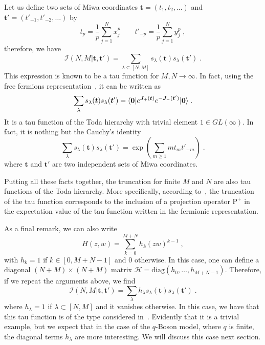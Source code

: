 \documentclass[a4paper,11pt]{amsart}
\begin{document}
Let us define two sets of Miwa coordinates \(\bm{t} = (t_1, t_2, \dots)\)
and \(\bm{t}' = (t'_{-1}, t'_{-2}, \dots)\) by
\begin{equation}
  t_p = \frac{1}{p}\sum_{j=1}^N x_j^p\qquad 
  t'_{-p} = \frac{1}{p}\sum_{j=1}^N y_j^p\; ,
\end{equation}
therefore, we have 
\begin{equation}
  \mathcal{I}(N, M|\bm{t}, \bm{t}') = \sum_{\lambda\subseteq [N,M]} s_\lambda(\bm{t}) s_\lambda(\bm{t}') \; .
\end{equation}
This expression is known to be a tau function for \(M, N\to \infty\).
In fact, using the free fermions representation~\cite{Alexandrov:2012tr},
it can be written as
\begin{equation}
\sum_{\lambda } s_{\lambda}(\bm{t}) s_{\lambda}(\bm{t}')
 = \langle\bm{0}\rvert e^{\bm{J}_+(\bm{t})} e^{-\bm{J}_-(\bm{t}')} \lvert\bm{0}\rangle\; .
\end{equation}
It is a tau function of the Toda hierarchy with trivial element \(1 \in GL(\infty)\).
In fact, it is nothing but the Cauchy's identity
\begin{equation}
  \sum_{\lambda } s_{\lambda}(\bm{t}) s_{\lambda}(\bm{t}')
    = \exp \left( \sum_{m\geq1} m t_m t'_{-m} \right) \; .
\end{equation}
where \(\bm{t}\) and \(\bm{t}'\) are two independent sets of Miwa coordinates.

Putting all these facts together, the truncation for finite \(M\) and
\(N\) are also tau functions of the Toda hierarchy. More specifically,
according to~\cite{Alexandrov:2012tr, Kharchev:1991gd,
  Zabrodin:2010ii}, the truncation of the tau function corresponds to
the inclusion of a projection operator \(\mathrm{P}^+\) in the
expectation value of the tau function written in the fermionic
representation.

As a final remark, we can also write
\begin{equation}
  H(z,w) = \sum_{k=0}^{M+N} h_k(zw)^{k-1} \; , 
\end{equation}
with \(h_k=1\) if \(k\in [0, M+N-1]\) and \(0\) otherwise. In this
case, one can define a diagonal \((N+M)\times (N+M)\) matrix
\(\mathcal{H} = \textrm{diag}(h_0, \dots, h_{M+N-1})\). Therefore, if
we repeat the arguments above, we find
\begin{equation}
\mathcal{I}(N, M|\bm{t}, \bm{t}') = \sum_{\lambda} h_\lambda s_\lambda(\bm{t}) s_\lambda(\bm{t}') \; .
\end{equation}
where \(h_\lambda = 1\) if \(\lambda \subset [N,M]\) and it vanishes
otherwise.  In this case, we have that this tau function is of the
type considered in~\cite{orlov:2001}. Evidently that it is a trivial
example, but we expect that in the case of the \(q\)-Boson model,
where \(q\) is finite, the diagonal terms \(h_\lambda\) are more
interesting. We will discuss this case next section.
\end{document}
